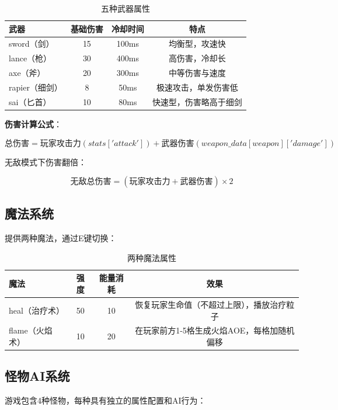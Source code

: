 \documentclass[12pt,a4paper]{ctexart}
\begin{document}
\begin{table}[H]
\centering
\small
\begin{tabular}{lccc}
\toprule
\textbf{武器} & \textbf{基础伤害} & \textbf{冷却时间} & \textbf{特点} \\
\midrule
sword（剑） & 15 & 100ms & 均衡型，攻速快 \\
lance（枪） & 30 & 400ms & 高伤害，冷却长 \\
axe（斧） & 20 & 300ms & 中等伤害与速度 \\
rapier（细剑） & 8 & 50ms & 极速攻击，单发伤害低 \\
sai（匕首） & 10 & 80ms & 快速型，伤害略高于细剑 \\
\bottomrule
\end{tabular}
\caption{五种武器属性}
\end{table}

\textbf{伤害计算公式}：

\[
\text{总伤害} = \text{玩家攻击力}(stats['attack']) + \text{武器伤害}(weapon\_data[weapon]['damage'])
\]

无敌模式下伤害翻倍：

\[
\text{无敌总伤害} = (\text{玩家攻击力} + \text{武器伤害}) \times 2
\]

\subsection{魔法系统}

提供两种魔法，通过E键切换：

\begin{table}[H]
\centering
\small
\begin{tabular}{lccc}
\toprule
\textbf{魔法} & \textbf{强度} & \textbf{能量消耗} & \textbf{效果} \\
\midrule
heal（治疗术） & 50 & 10 & 恢复玩家生命值（不超过上限），播放治疗粒子 \\
flame（火焰术） & 10 & 20 & 在玩家前方1-5格生成火焰AOE，每格加随机偏移 \\
\bottomrule
\end{tabular}
\caption{两种魔法属性}
\end{table}

\subsection{怪物AI系统}

游戏包含4种怪物，每种具有独立的属性配置和AI行为：
\end{document}
